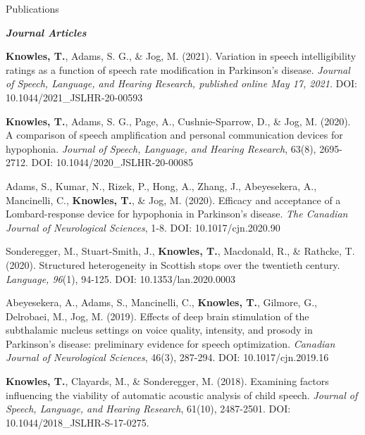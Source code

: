 \documentclass{resume} %
\begin{document}
\begin{rSection}{Publications}

\begin{center}
	{\bf \emph{Journal Articles}}
\end{center}

\begin{etaremune}

	\item {\bf Knowles, T.}, Adams, S. G., \& Jog, M. (2021). Variation in speech intelligibility ratings as a function of speech rate modification in Parkinson's disease. \emph{Journal of Speech, Language, and Hearing Research, published online May 17, 2021}. DOI: 10.1044/2021\_JSLHR-20-00593

	\item {\bf Knowles, T.}, Adams, S. G., Page, A., Cushnie-Sparrow, D., \& Jog, M. (2020). A comparison of speech amplification and personal communication devices for hypophonia. \emph{Journal of Speech, Language, and Hearing Research}, 63(8), 2695-2712. DOI: 10.1044/2020\_JSLHR-20-00085
	
	\item Adams, S., Kumar, N., Rizek, P., Hong, A., Zhang, J., Abeyesekera, A., Mancinelli, C., {\bf Knowles, T.}, \& Jog, M. (2020). Efficacy and acceptance of a Lombard-response device for hypophonia in Parkinson’s disease. \emph{The Canadian Journal of Neurological Sciences}, 1-8. DOI: 10.1017/cjn.2020.90

	\item Sonderegger, M., Stuart-Smith, J., {\bf Knowles, T.}, Macdonald, R., \& Rathcke, T. (2020). Structured heterogeneity in Scottish stops over the twentieth century. \emph{Language, 96}(1), 94-125. DOI: 10.1353/lan.2020.0003
	
	\item Abeyesekera, A., Adams, S., Mancinelli, C., {\bf Knowles, T.}, Gilmore, G., Delrobaei, M., Jog, M. (2019).  Effects of deep brain stimulation of the subthalamic nucleus settings on voice quality, intensity, and prosody in Parkinson’s disease: preliminary evidence for speech optimization. \emph{Canadian Journal of Neurological Sciences}, 46(3), 287-294. DOI: 10.1017/cjn.2019.16	

	\item {\bf Knowles, T.}, Clayards, M., \& Sonderegger, M. (2018). Examining factors influencing the viability of automatic acoustic analysis of child speech. \emph{Journal of Speech, Language, and Hearing Research}, 61(10), 2487-2501. DOI: 10.1044/2018\_JSLHR-S-17-0275.


\end{etaremune}
\end{rSection}
\end{document}

